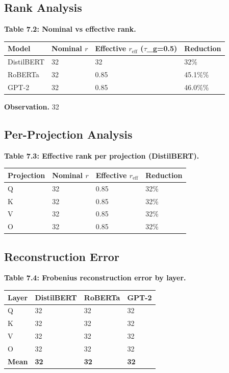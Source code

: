 \subsection{Rank Analysis}

\textbf{Table 7.2: Nominal vs effective rank.}

\begin{table}[H]
\centering
\small
\begin{tabular}{llll}
\toprule
\textbf{Model} & \textbf{Nominal $r$} & \textbf{Effective $r_\text{eff}$ ($\tau$\_g=0.5)} & \textbf{Reduction} \\
\midrule
DistilBERT & 32 & 32 & 32\% \\
RoBERTa & 32 & 0.85 & 45.1\%\% \\
GPT-2 & 32 & 0.85 & 46.0\%\% \\
\bottomrule
\end{tabular}
\end{table}

\textbf{Observation.} 32

\subsection{Per-Projection Analysis}

\textbf{Table 7.3: Effective rank per projection (DistilBERT).}

\begin{table}[H]
\centering
\small
\begin{tabular}{llll}
\toprule
\textbf{Projection} & \textbf{Nominal $r$} & \textbf{Effective $r_\text{eff}$} & \textbf{Reduction} \\
\midrule
Q & 32 & 0.85 & 32\% \\
K & 32 & 0.85 & 32\% \\
V & 32 & 0.85 & 32\% \\
O & 32 & 0.85 & 32\% \\
\bottomrule
\end{tabular}
\end{table}

\subsection{Reconstruction Error}

\textbf{Table 7.4: Frobenius reconstruction error by layer.}

\begin{table}[H]
\centering
\small
\begin{tabular}{llll}
\toprule
\textbf{Layer} & \textbf{DistilBERT} & \textbf{RoBERTa} & \textbf{GPT-2} \\
\midrule
Q & 32 & 32 & 32 \\
K & 32 & 32 & 32 \\
V & 32 & 32 & 32 \\
O & 32 & 32 & 32 \\
\textbf{Mean} & \textbf{32} & \textbf{32} & \textbf{32} \\
\bottomrule
\end{tabular}
\end{table}

